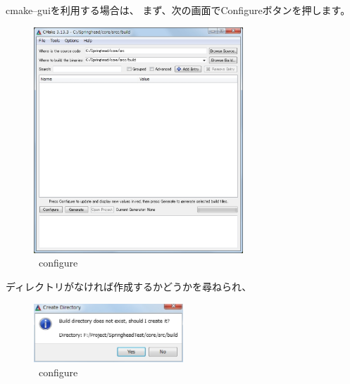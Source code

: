 cmake--guiを利用する場合は、
まず、次の画面でConfigureボタンを押します。
\begin{narrow}[15pt]
	\begin{figure}[h]
	\begin{center}
	\includegraphics[width=0.7\textwidth]{fig/CmakeConfigure1.eps}
	\end{center}
	\caption{\cmake\ configure}
	\label{fig:CmakeConfigure}
	\end{figure}
\end{narrow}

\DQuote{\BldDir}ディレクトリがなければ作成するかどうかを尋ねられ、
\begin{narrow}[15pt]
	\begin{figure}[h]
	\begin{center}
	\includegraphics[width=0.5\textwidth]{fig/CmakeConfigure2.eps}
	\end{center}
	\caption{\cmake\ configure}
	\label{fig:CreateWorkSpace}
	\end{figure}
\end{narrow}

